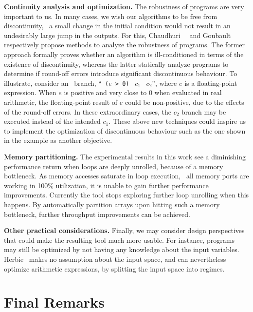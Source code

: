 \textbf{Continuity analysis and optimization.} The robustness of programs
are very important to us.  In many cases, we wish our algorithms to be
free from discontinuity, \ie~a small change in the initial condition
would not result in an undesirably large jump in the outputs.  For this,
Chaudhuri~\etal~\cite{chaudhuri11} and Goubault~\etal~\cite{goubault13}
respectively propose methods to analyze the robustness of programs.  The
former approach formally proves whether an algorithm is ill-conditioned in
terms of the existence of discontinuity, whereas the latter statically analyze
programs to determine if round-off errors introduce significant discontinuous
behaviour.  To illustrate, consider an \iflit~branch, ``\iflit~\texttt{($e$ >
0)} \thenlit~$c_1$ \elselit~$c_2$'', where $e$ is a floating-point expression.
When $e$ is positive and very close to $0$ when evaluated in real arithmetic,
the floating-point result of $e$ could be non-positive, due to the effects
of the round-off errors.  In these extraordinary cases, the $c_2$ branch may
be executed instead of the intended $c_1$.  These above new techniques could
inspire us to implement the optimization of discontinuous behaviour such as the
one shown in the example as another objective.

\textbf{Memory partitioning.} The experimental results in this work see a
diminishing performance return when loops are deeply unrolled, because of a
memory bottleneck.  As memory accesses saturate in loop execution, \ie~all
memory ports are working in 100\% utilization, it is unable to gain further
performance improvements.  Currently the tool stops exploring further loop
unrolling when this happens.  By automatically partition arrays upon hitting
such a memory bottleneck, further throughput improvements can be achieved.

\textbf{Other practical considerations.}  Finally, we may consider design
perspectives that could make the resulting tool much more usable.  For
instance, programs may still be optimized by not having any knowledge about the
input variables.  Herbie~\cite{panchekha15} makes no assumption about the input
space, and can nevertheless optimize arithmetic expressions, by splitting the
input space into regimes.


\section{Final Remarks}
\label{sub:final_remarks}

